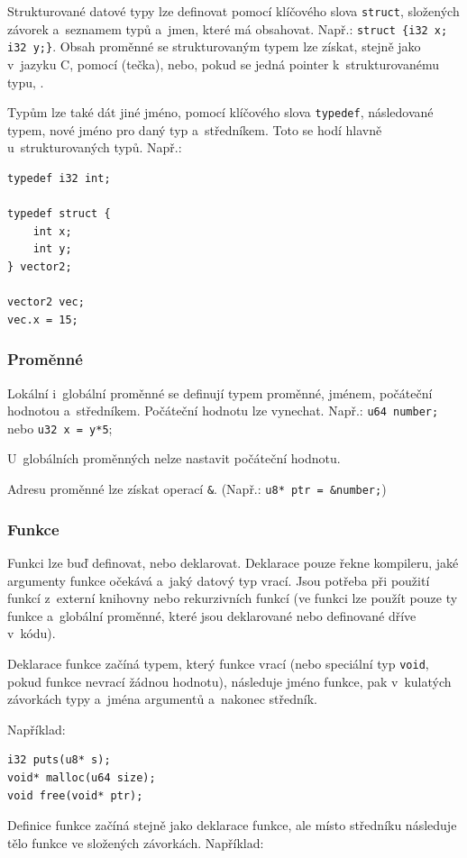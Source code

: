 \documentclass[12pt]{article}
\def\code#1{\texttt{#1}}
\begin{document}
Strukturované datové typy lze definovat pomocí klíčového slova \code{struct}, složených závorek a~seznamem typů a~jmen, které má obsahovat.
Např.: \code{struct \{i32 x; i32 y;\}}.
Obsah proměnné se strukturovaným typem lze získat, stejně jako v~jazyku C, pomocí \uv{\code{.}} (tečka), nebo, pokud se jedná pointer k~strukturovanému typu, \uv{\code{->}}.

Typům lze také dát jiné jméno, pomocí klíčového slova \code{typedef}, následované typem, nové jméno pro daný typ a~středníkem. Toto se hodí hlavně u~strukturovaných typů.
Např.:
\begin{lstlisting}
typedef i32 int;

typedef struct {
	int x;
	int y;
} vector2;

vector2 vec;
vec.x = 15;
\end{lstlisting}

\subsubsection{Proměnné}
Lokální i~globální proměnné se definují typem proměnné, jménem, počáteční hodnotou a~středníkem. Počáteční hodnotu lze vynechat.
Např.: \code{u64 number;} nebo \code{u32 x = y*5};

U~globálních proměnných nelze nastavit počáteční hodnotu.

Adresu proměnné lze získat operací \code{\&}. (Např.: \code{u8* ptr = \&number;})

\subsubsection{Funkce}
Funkci lze buď definovat, nebo deklarovat. Deklarace pouze řekne kompileru, jaké argumenty funkce očekává a~jaký datový typ vrací.
Jsou potřeba při použití funkcí z~externí knihovny nebo rekurzivních funkcí (ve funkci lze použít pouze ty funkce a~globální proměnné, které jsou deklarované nebo definované dříve v~kódu).

Deklarace funkce začíná typem, který funkce vrací (nebo speciální typ \code{void}, pokud funkce nevrací žádnou hodnotu),
následuje jméno funkce, pak v~kulatých závorkách typy a~jména argumentů a~nakonec středník.

Například:
\begin{lstlisting}
i32 puts(u8* s);
void* malloc(u64 size);
void free(void* ptr);
\end{lstlisting}

Definice funkce začíná stejně jako deklarace funkce, ale místo středníku následuje tělo funkce ve složených závorkách.
Například:
\end{document}
